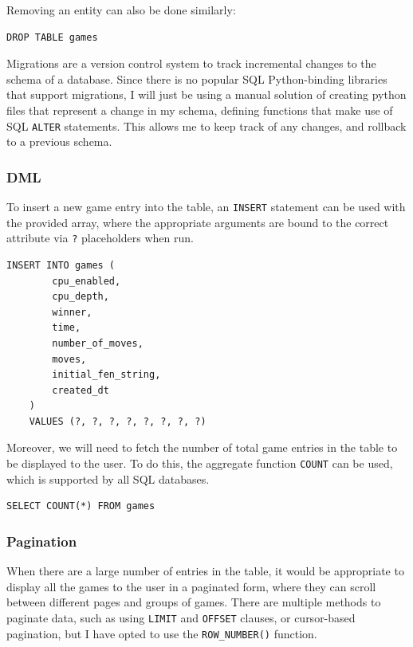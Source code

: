 \documentclass[../main/main.tex]{subfiles}
\begin{document}
\noindent Removing an entity can also be done similarly:

\begin{lstlisting}[language=sqlite, frame=lines]
    DROP TABLE games
\end{lstlisting}

Migrations are a version control system to track incremental changes to the schema of a database. Since there is no popular SQL Python-binding libraries that support migrations, I will just be using a manual solution of creating python files that represent a change in my schema, defining functions that make use of SQL \lstinline[language=sqlite]{ALTER} statements. This allows me to keep track of any changes, and rollback to a previous schema.

\subsubsection*{DML}
\label{sec:design-dml}
To insert a new game entry into the table, an \lstinline[language=sqlite]{INSERT} statement can be used with the provided array, where the appropriate arguments are bound to the correct attribute via \lstinline[language=Python]{?} placeholders when run.

\begin{lstlisting}[language=sqlite, frame=lines]
    INSERT INTO games (
        cpu_enabled,
        cpu_depth,
        winner,
        time,
        number_of_moves,
        moves,
        initial_fen_string,
        created_dt
    )
    VALUES (?, ?, ?, ?, ?, ?, ?, ?)
\end{lstlisting}

Moreover, we will need to fetch the number of total game entries in the table to be displayed to the user. To do this, the aggregate function \lstinline[language=sqlite]{COUNT} can be used, which is supported by all SQL databases.

\begin{lstlisting}[language=sqlite, frame=lines]
    SELECT COUNT(*) FROM games
\end{lstlisting}

\subsubsection*{Pagination}
When there are a large number of entries in the table, it would be appropriate to display all the games to the user in a paginated form, where they can scroll between different pages and groups of games. There are multiple methods to paginate data, such as using \lstinline[language=sqlite]{LIMIT} and \lstinline[language=sqlite]{OFFSET} clauses, or cursor-based pagination, but I have opted to use the \lstinline[language=sqlite]{ROW_NUMBER()} function.
\end{document}
